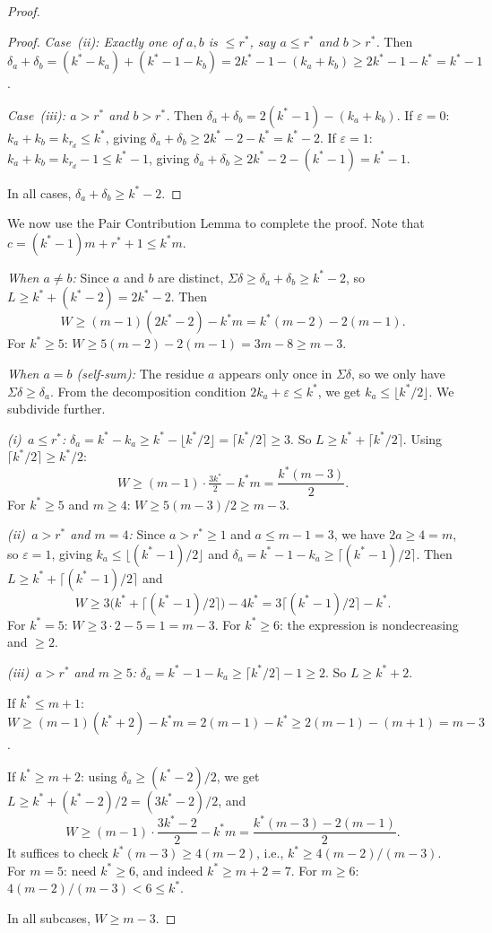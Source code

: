 \documentclass[11pt]{amsart}
\theoremstyle{definition}
\theoremstyle{remark}
\begin{document}
\begin{proof}
\begin{proof}
\emph{Case~(ii): Exactly one of $a, b$ is $\le r^*$, say $a \le r^*$ and $b > r^*$.}
Then $\delta_a + \delta_b = (k^* - k_a) + (k^* - 1 - k_b) = 2k^* - 1 - (k_a + k_b)
\ge 2k^* - 1 - k^* = k^* - 1$.

\emph{Case~(iii): $a > r^*$ and $b > r^*$.}
Then $\delta_a + \delta_b = 2(k^* - 1) - (k_a + k_b)$.
If $\varepsilon = 0$: $k_a + k_b = k_{r_d} \le k^*$, giving
$\delta_a + \delta_b \ge 2k^* - 2 - k^* = k^* - 2$.
If $\varepsilon = 1$: $k_a + k_b = k_{r_d} - 1 \le k^* - 1$, giving
$\delta_a + \delta_b \ge 2k^* - 2 - (k^* - 1) = k^* - 1$.

In all cases, $\delta_a + \delta_b \ge k^* - 2$.
\end{proof}

We now use the Pair Contribution Lemma to complete the proof.
Note that $c = (k^* - 1)m + r^* + 1 \le k^* m$.

\smallskip
\emph{When $a \neq b$:}
Since $a$ and $b$ are distinct, $\Sigma\delta \ge \delta_a + \delta_b \ge k^* - 2$,
so $L \ge k^* + (k^* - 2) = 2k^* - 2$.  Then
\[
  W \ge (m - 1)(2k^* - 2) - k^* m = k^*(m - 2) - 2(m - 1).
\]
For $k^* \ge 5$: $W \ge 5(m - 2) - 2(m - 1) = 3m - 8 \ge m - 3$.

\smallskip
\emph{When $a = b$ (self-sum):}
The residue $a$ appears only once in $\Sigma\delta$, so we only have
$\Sigma\delta \ge \delta_a$.  From the decomposition condition
$2k_a + \varepsilon \le k^*$, we get $k_a \le \lfloor k^*/2 \rfloor$.
We subdivide further.

\emph{(i)~$a \le r^*$:}
$\delta_a = k^* - k_a \ge k^* - \lfloor k^*/2 \rfloor = \lceil k^*/2 \rceil \ge 3$.
So $L \ge k^* + \lceil k^*/2 \rceil$.  Using $\lceil k^*/2 \rceil \ge k^*/2$:
\[
  W \ge (m - 1) \cdot \tfrac{3k^*}{2} - k^* m = \frac{k^*(m - 3)}{2}.
\]
For $k^* \ge 5$ and $m \ge 4$: $W \ge 5(m-3)/2 \ge m - 3$.

\emph{(ii)~$a > r^*$ and $m = 4$:}
Since $a > r^* \ge 1$ and $a \le m - 1 = 3$, we have $2a \ge 4 = m$,
so $\varepsilon = 1$, giving $k_a \le \lfloor(k^* - 1)/2\rfloor$ and
$\delta_a = k^* - 1 - k_a \ge \lceil(k^* - 1)/2\rceil$.
Then $L \ge k^* + \lceil(k^* - 1)/2\rceil$ and
\[
  W \ge 3\bigl(k^* + \lceil(k^* - 1)/2\rceil\bigr) - 4k^* = 3\lceil(k^* - 1)/2\rceil - k^*.
\]
For $k^* = 5$: $W \ge 3 \cdot 2 - 5 = 1 = m - 3$.
For $k^* \ge 6$: the expression is nondecreasing and $\ge 2$.

\emph{(iii)~$a > r^*$ and $m \ge 5$:}
$\delta_a = k^* - 1 - k_a \ge \lceil k^*/2 \rceil - 1 \ge 2$.
So $L \ge k^* + 2$.

If $k^* \le m + 1$: $W \ge (m - 1)(k^* + 2) - k^* m = 2(m - 1) - k^*
\ge 2(m - 1) - (m + 1) = m - 3$.

If $k^* \ge m + 2$: using $\delta_a \ge (k^* - 2)/2$,
we get $L \ge k^* + (k^* - 2)/2 = (3k^* - 2)/2$, and
\[
  W \ge (m - 1) \cdot \frac{3k^* - 2}{2} - k^* m = \frac{k^*(m - 3) - 2(m - 1)}{2}.
\]
It suffices to check $k^*(m - 3) \ge 4(m - 2)$, i.e.,
$k^* \ge 4(m-2)/(m-3)$.  For $m = 5$: need $k^* \ge 6$, and indeed
$k^* \ge m + 2 = 7$.  For $m \ge 6$: $4(m - 2)/(m - 3) < 6 \le k^*$.

\medskip
In all subcases, $W \ge m - 3$.
\end{proof}
\end{document}
